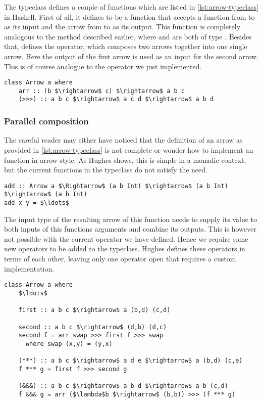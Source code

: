 The  typeclass defines a couple of functions which are listed in \cref{lst:arrow-typeclass} in Haskell. First of all, it defines  to be a function that accepts a function from  to  as its input and the arrow from  to  as its output. This function is completely analogous to the  method described earlier, where  and  are both of type \obs. Besides that,  defines the \code{>>>} operator, which composes two arrows together into one single arrow. Here the output of the first arrow is used as an input for the second arrow. This is of course analogue to the  operator we just implemented.

\begin{lstlisting}[style=HaskellStyle, caption={\code{Arrow} typeclass}, label={lst:arrow-typeclass}]
class Arrow a where
    arr :: (b $\rightarrow$ c) $\rightarrow$ a b c
    (>>>) :: a b c $\rightarrow$ a c d $\rightarrow$ a b d
\end{lstlisting}

\subsubsection{Parallel composition}
The careful reader may either have noticed that the definition of an arrow as provided in \cref{lst:arrow-typeclass} is not complete or wonder how to implement an  function in arrow style. As Hughes shows, this is simple in a monadic context, but the current functions in the  typeclass do not satisfy the need.

\begin{lstlisting}[style=InlineHaskellStyle]
add :: Arrow a $\Rightarrow$ (a b Int) $\rightarrow$ (a b Int) $\rightarrow$ (a b Int)
add x y = $\ldots$
\end{lstlisting}

The input type  of the resulting arrow of this function needs to supply its value to both inputs of this functions arguments and combine its outputs. This is however not possible with the current \code{>>>} operator we have defined. Hence we require some new operators to be added to the  typeclass. Hughes defines these operators in terms of each other, leaving only one operator open that requires a custom implementation.

\begin{lstlisting}[style=HaskellStyle, caption={\code{Arrow} typeclass}, label={lst:arrow-typeclass-full}]
class Arrow a where
    $\ldots$
    
    first :: a b c $\rightarrow$ a (b,d) (c,d)
    
    second :: a b c $\rightarrow$ (d,b) (d,c)
    second f = arr swap >>> first f >>> swap
      where swap (x,y) = (y,x)
      
    (***) :: a b c $\rightarrow$ a d e $\rightarrow$ a (b,d) (c,e)
    f *** g = first f >>> second g
    
    (&&&) :: a b c $\rightarrow$ a b d $\rightarrow$ a b (c,d)
    f &&& g = arr ($\lambda$b $\rightarrow$ (b,b)) >>> (f *** g)
\end{lstlisting}

